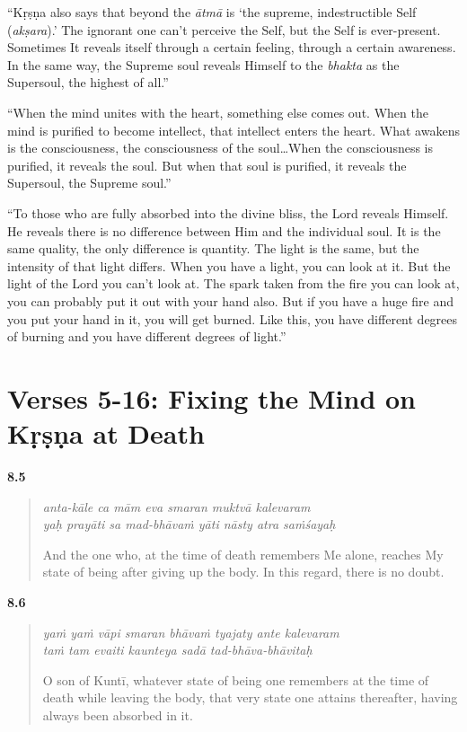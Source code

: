 \enquote{Kṛṣṇa also says that beyond the \textit{ātmā} is \enquote{the supreme, indestructible Self (\textit{akṣara}).} The ignorant one can’t perceive the Self, but the Self is ever-present. Sometimes It reveals itself through a certain feeling, through a certain awareness. In the same way, the Supreme soul reveals Himself to the \textit{bhakta} as the Supersoul, the highest of all.}

\enquote{When the mind unites with the heart, something else comes out. When the mind is purified to become intellect, that intellect enters the heart. What awakens is the consciousness, the consciousness of the soul\ldots When the consciousness is purified, it reveals the soul. But when that soul is purified, it reveals the Supersoul, the Supreme soul.}

\enquote{To those who are fully absorbed into the divine bliss, the Lord reveals Himself. He reveals there is no difference between Him and the individual soul. It is the same quality, the only difference is quantity. The light is the same, but the intensity of that light differs. When you have a light, you can look at it. But the light of the Lord you can’t look at. The spark taken from the fire you can look at, you can probably put it out with your hand also. But if you have a huge fire and you put your hand in it, you will get burned. Like this, you have different degrees of burning and you have different degrees of light.}

\section{Verses 5-16: Fixing the Mind on Kṛṣṇa at Death}\label{sec-verses-5-16-fixing-the-mind-on-krsna-at-death}


\par\noindent\textbf{8.5}\par
\begin{verse}
\textit{anta-kāle ca mām eva smaran muktvā kalevaram} \\
\textit{yaḥ prayāti sa mad-bhāvaṁ yāti nāsty atra saṁśayaḥ}

\noindent And the one who, at the time of death remembers Me alone, reaches My state of being after giving up the body. In this regard, there is no doubt.
\end{verse}
\par



\par\noindent\textbf{8.6}\par
\begin{verse}
\textit{yaṁ yaṁ vāpi smaran bhāvaṁ tyajaty ante kalevaram} \\
\textit{taṁ tam evaiti kaunteya sadā tad-bhāva-bhāvitaḥ}

\noindent O son of Kuntī, whatever state of being one remembers at the time of death while leaving the body, that very state one attains thereafter, having always been absorbed in it.
\end{verse}
\par




